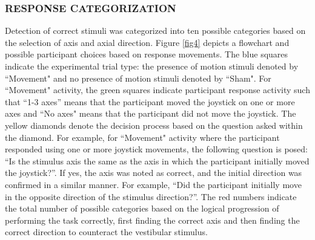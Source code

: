 \documentclass{ieeeaccess}
\begin{document}
\subsubsection{RESPONSE CATEGORIZATION}
Detection of correct stimuli was categorized into ten possible categories based on the selection of axis and axial direction. Figure \ref{fig4} depicts a flowchart and possible participant choices based on response movements. The blue squares indicate the experimental trial type: the presence of motion stimuli denoted by ``Movement" and no presence of motion stimuli denoted by “Sham". For “Movement" activity, the green squares indicate participant response activity such that “1-3 axes” means that the participant moved the joystick on one or more axes and “No axes" means that the participant did not move the joystick. The yellow diamonds denote the decision process based on the question asked within the diamond. For example, for “Movement" activity where the participant responded using one or more joystick movements, the following question is posed: “Is the stimulus axis the same as the axis in which the participant initially moved the joystick?”. If yes, the axis was noted as correct, and the initial direction was confirmed in a similar manner. For example, “Did the participant initially move in the opposite direction of the stimulus direction?”. The red numbers indicate the total number of possible categories based on the logical progression of performing the task correctly, first finding the correct axis and then finding the correct direction to counteract the vestibular stimulus.
\end{document}
